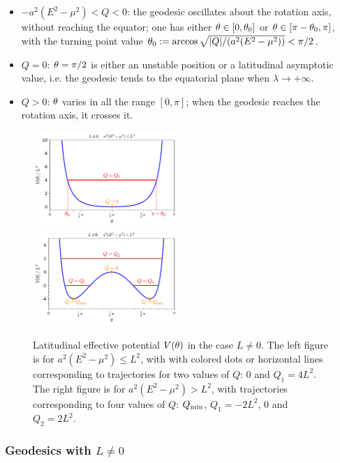 \begin{itemize}
\begin{itemize}
\item $-a^2(E^2 - \mu^2) < Q < 0$: the geodesic oscillates about the rotation
axis, without reaching the equator; one has either $\theta\in[0,\theta_0]$ or
$\theta\in [\pi - \theta_0,\pi]$, with the turning point value
$\theta_0 := \arccos\sqrt{|Q|/(a^2(E^2 - \mu^2))} < \pi/2$.
\item $Q=0$: $\theta=\pi/2$ is either an unstable position or
a latitudinal asymptotic value, i.e. the geodesic tends to the equatorial
plane when $\lambda\to+\infty$.
\item $Q>0$: $\theta$ varies in all the range $[0,\pi]$; when
the geodesic reaches the rotation axis, it crosses it.
\end{itemize}
\end{itemize}


\begin{figure}
\centerline{\includegraphics[width=0.49\textwidth]{gek_th_pot_high_L.pdf}
\ \includegraphics[width=0.49\textwidth]{gek_th_pot_low_L.pdf}}
\caption[]{\label{f:gek:th_pot_L_non0} \footnotesize
Latitudinal effective potential $V(\theta)$ in the case $L\neq0$.
The left figure is for $a^2(E^2 - \mu^2) \leq L^2$, with
with colored dots or horizontal lines
corresponding to trajectories for
two values of $Q$: $0$ and $Q_1= 4 L^2$.
The right figure is for $a^2(E^2 - \mu^2) > L^2$, with trajectories corresponding
to four values of $Q$: $Q_{\rm min}$, $Q_1 = - 2 L^2$, $0$ and $Q_2 = 2 L^2$.
}
\end{figure}


\subsubsection{Geodesics with $L\not=0$}

